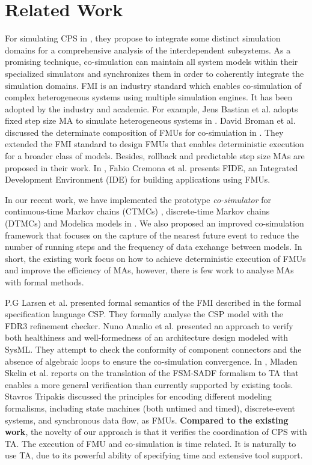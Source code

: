 \section{Related Work}
\label{sec:relateworks}
For simulating CPS in \cite{GeorgMRW14}, they propose to integrate some distinct simulation domains for a comprehensive analysis of the interdependent subsystems. As a promising technique, co-simulation \cite{Bogomolov2015Co} can maintain all system models within their specialized simulators and synchronizes them in order to coherently integrate the simulation domains. FMI \cite{Blochwitz2011The}\cite{FMI2INTRO} is an industry standard which enables co-simulation of complex heterogeneous systems using multiple simulation engines. It has been adopted by the industry and academic. For example, Jens Bastian et al. adopts fixed step size MA to simulate heterogeneous systems in \cite{Bastian2011Master}.
David Broman et al. discussed the determinate composition of FMUs for co-simulation in \cite{BromanBGLMTW13}. They extended the FMI standard to design FMUs that enables deterministic execution for a broader class of models. Besides, rollback and predictable step size MAs are proposed in their work. In \cite{CremonaLTBL16}, Fabio Cremona et al. presents FIDE, an Integrated Development Environment (IDE) for building applications using FMUs. 

In our recent work, we have implemented the prototype \textit{co-simulator} for continuous-time Markov chains (CTMCs) \cite{DanosHGS17}, discrete-time Markov chains (DTMCs) \cite{Guerry13} and Modelica models in \cite{LiuJWCD16}. We also proposed an improved co-simulation framework that focuses on the capture of the nearest future event to reduce the number of running steps and the frequency of data exchange between models. In short, the existing work focus on how to achieve deterministic execution of FMUs and improve the efficiency of MAs, however, there is few work to analyse MAs with formal methods.

P.G Larsen et al. \cite{Larsen2016Integrated} presented formal semantics of the FMI described in the formal specification language CSP. They formally analyse the CSP model with the FDR3 refinement checker. Nuno Amalio et al. \cite{AmalioPCW16} presented an approach to verify both healthiness and well-formedness of an architecture design modeled with SysML. They attempt to check the conformity of component connectors and the absence of algebraic loops to ensure the co-simulation convergence.
In \cite{SkelinWOHL15}, Mladen Skelin et al. reports on the translation of the FSM-SADF formalism to TA that enables a more general
verification than currently supported by existing tools. Stavros Tripakis \cite{Tripakis15} discussed the principles for encoding different modeling formalisms, including state machines (both untimed and timed), discrete-event systems, and synchronous data flow, as FMUs. 
\textbf{Compared to the existing work}, the novelty of our approach is that it verifies the coordination of CPS with TA. The execution of FMU and co-simulation is time related. It is naturally to use TA, due to its powerful ability of specifying time and extensive tool support.


